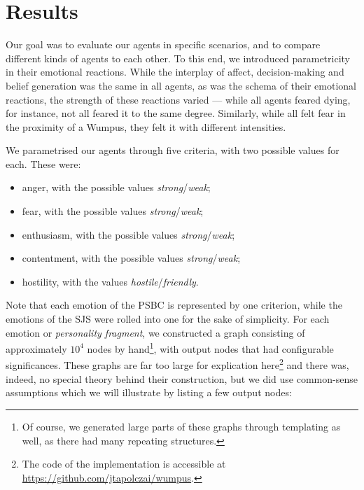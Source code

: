 \section{Results}\label{sec:results}

Our goal was to evaluate our agents in specific scenarios, and to compare different kinds of agents to each other. To this end, we introduced parametricity in their emotional reactions. While the interplay of affect, decision-making and belief generation was the same in all agents, as was the schema of their emotional reactions, the strength of these reactions varied --- while all agents feared dying, for instance, not all feared it to the same degree. Similarly, while all felt fear in the proximity of a Wumpus, they felt it with different intensities.

We parametrised our agents through five criteria, with two possible values for each. These were:

\begin{itemize}
	\item anger, with the possible values \emph{strong}/\emph{weak};
	\item fear, with the possible values \emph{strong}/\emph{weak};
	\item enthusiasm, with the possible values \emph{strong}/\emph{weak};
	\item contentment, with the possible values \emph{strong}/\emph{weak};
	\item hostility, with the values \emph{hostile}/\emph{friendly}.
\end{itemize}

Note that each emotion of the PSBC is represented by one criterion, while the emotions of the SJS were rolled into one for the sake of simplicity. For each emotion or \emph{personality fragment}, we constructed a graph consisting of approximately $10^4$ nodes by hand\footnote{Of course, we generated large parts of these graphs through templating as well, as there had many repeating structures.}, with output nodes that had configurable significances. These graphs are far too large for explication here\footnote{The code of the implementation is accessible at \url{https://github.com/jtapolczai/wumpus}.} and there was, indeed, no special theory behind their construction, but we did use common-sense assumptions which we will illustrate by listing a few output nodes:

